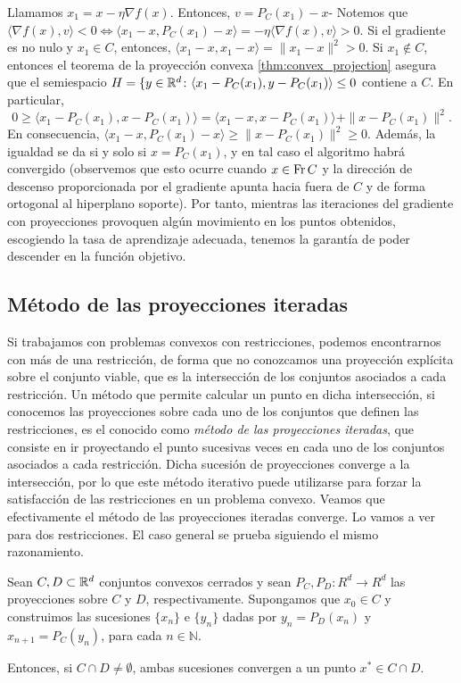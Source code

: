 \documentclass{book}
\begin{document}
Llamamos $x_1 = x - \eta\nabla f(x)$. Entonces, $v = P_C(x_1) - x$- Notemos que $\langle \nabla f(x), v \rangle < 0 \iff \langle x_1 - x, P_C(x_1) - x \rangle = -\eta \langle \nabla f(x), v \rangle > 0$. Si el gradiente es no nulo y $x_1 \in C$, entonces, $\langle x_1 - x, x_1 - x \rangle = \|x_1 - x \|^2 > 0$. Si $x_1 \notin C$, entonces el teorema de la proyección convexa \ref{thm:convex_projection} asegura que el semiespacio $H = \{y \in \mathbb{R}^d \colon \langle x_1 - P_C(x_1), y - P_C(x_1) \rangle \le 0$ contiene a $C$. En particular,
\[ 0 \ge \langle x_1 - P_C(x_1), x - P_C(x_1) \rangle = \langle x_1 - x, x - P_C(x_1) \rangle + \|x - P_C(x_1)\|^2.  \]
En consecuencia, $ \langle x_1 - x, P_C(x_1) - x \rangle \ge \|x - P_C(x_1)\|^2 \ge 0$. Además, la igualdad se da si y solo si $x = P_C(x_1)$, y en tal caso el algoritmo habrá convergido (observemos que esto ocurre cuando $x \in \operatorname{Fr} C$ y la dirección de descenso proporcionada por el gradiente apunta hacia fuera de $C$ y de forma ortogonal al hiperplano soporte). Por tanto, mientras las iteraciones del gradiente con proyecciones provoquen algún movimiento en los puntos obtenidos, escogiendo la tasa de aprendizaje adecuada, tenemos la garantía de poder descender en la función objetivo.

\subsection{Método de las proyecciones iteradas}

Si trabajamos con problemas convexos con restricciones, podemos encontrarnos con más de una restricción, de forma que no conozcamos una proyección explícita sobre el conjunto viable, que es la intersección de los conjuntos asociados a cada restricción. Un método que permite calcular un punto en dicha intersección, si conocemos las proyecciones sobre cada uno de los conjuntos que definen las restricciones, es el conocido como \emph{método de las proyecciones iteradas}, que consiste en ir proyectando el punto sucesivas veces en cada uno de los conjuntos asociados a cada restricción. Dicha sucesión de proyecciones converge a la intersección, por lo que este método iterativo puede utilizarse para forzar la satisfacción de las restricciones en un problema convexo. Veamos que efectivamente el método de las proyecciones iteradas converge. Lo vamos a ver para dos restricciones. El caso general se prueba siguiendo el mismo razonamiento.

\begin{thm} \label{thm:iter_proj}
	Sean $C, D \subset \mathbb{R}^d$ conjuntos convexos cerrados y sean $P_C, P_D \colon R^d \to R^d$ las proyecciones sobre $C$ y $D$, respectivamente. Supongamos que $x_0 \in C$ y construimos las sucesiones $\{x_n\}$ e $\{y_n\}$ dadas por $y_n = P_D(x_n)$ y $x_{n+1} = P_C(y_n)$, para cada $n \in \mathbb{N}$.

	Entonces, si $C \cap D \ne \emptyset$, ambas sucesiones convergen a un punto $x^* \in C \cap D$.
\end{thm}
\end{document}
